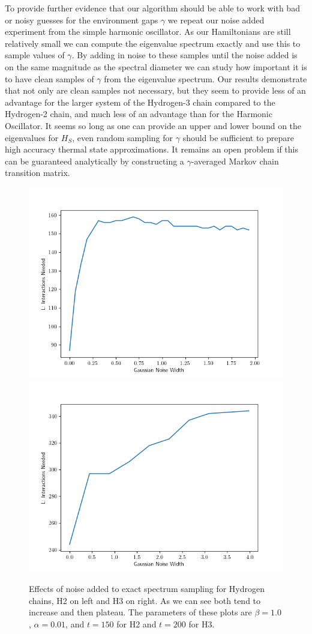 \documentclass{article}
\begin{document}
To provide further evidence that our algorithm should be able to work with bad or noisy guesses for the environment gaps $\gamma$ we repeat our noise added experiment from the simple harmonic oscillator. As our Hamiltonians are still relatively small we can compute the eigenvalue spectrum exactly and use this to sample values of $\gamma$. By adding in noise to these samples until the noise added is on the same magnitude as the spectral diameter we can study how important it is to have clean samples of $\gamma$ from the eigenvalue spectrum. Our results demonstrate that not only are clean samples not necessary, but they seem to provide less of an advantage for the larger system of the Hydrogen-3 chain compared to the Hydrogen-2 chain, and much less of an advantage than for the Harmonic Oscillator. It seems so long as one can provide an upper and lower bound on the eigenvalues for $H_S$, even random sampling for $\gamma$ should be sufficient to prepare high accuracy thermal state approximations. It remains an open problem if this can be guaranteed analytically by constructing a $\gamma$-averaged Markov chain transition matrix.

\begin{figure}
    \centering
    \includegraphics[width=0.475\linewidth]{numerics/data/h_chain_with_noise_1.png}
    \includegraphics[width=0.475\linewidth]{numerics/data/h_chain_3_with_noise_2.png}
    \caption{Effects of noise added to exact spectrum sampling for Hydrogen chains, H2 on left and H3 on right. As we can see both tend to increase and then plateau. The parameters of these plots are $\beta = 1.0$, $\alpha = 0.01$, and $t = 150$ for H2 and $t = 200$ for H3.}
    \label{fig:h_chain_with_noise}
\end{figure}
\end{document}
